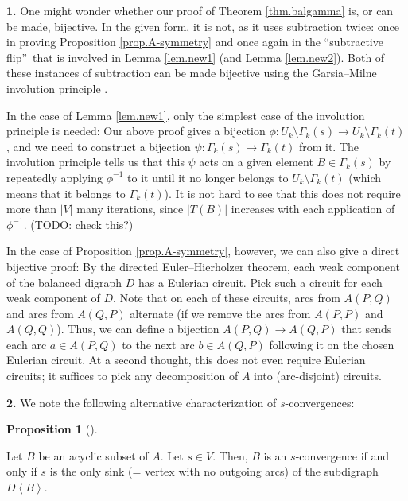 \documentclass[numbers=enddot,12pt,final,onecolumn,notitlepage]{scrartcl}%
\theoremstyle{definition}
\newtheorem{prop}[theo]{Proposition}
\newenvironment{proposition}[1][]
{\begin{prop}[#1]\begin{leftbar}}
{\end{leftbar}\end{prop}}
\theoremstyle{plainsl}
\begin{document}
\hspace{\parindent} \textbf{1.} One might wonder whether our proof of Theorem
\ref{thm.balgamma} is, or can be made, bijective. In the given form, it is
not, as it uses subtraction twice: once in proving Proposition
\ref{prop.A-symmetry} and once again in the \textquotedblleft subtractive
flip\textquotedblright\ that is involved in Lemma \ref{lem.new1} (and Lemma
\ref{lem.new2}). Both of these instances of subtraction can be made bijective
using the Garsia--Milne involution principle \cite[\S 4.6]{StaWhi86}.

In the case of Lemma \ref{lem.new1}, only the simplest case of the involution
principle is needed: Our above proof gives a bijection $\phi:U_{k}%
\setminus\Gamma_{k}\left(  s\right)  \rightarrow U_{k}\setminus\Gamma
_{k}\left(  t\right)  $, and we need to construct a bijection $\psi:\Gamma
_{k}\left(  s\right)  \rightarrow\Gamma_{k}\left(  t\right)  $ from it. The
involution principle tells us that this $\psi$ acts on a given element
$B\in\Gamma_{k}\left(  s\right)  $ by repeatedly applying $\phi^{-1}$ to it
until it no longer belongs to $U_{k}\setminus\Gamma_{k}\left(  t\right)  $
(which means that it belongs to $\Gamma_{k}\left(  t\right)  $). It is not
hard to see that this does not require more than $\left\vert V\right\vert $
many iterations, since $\left\vert T\left(  B\right)  \right\vert $ increases
with each application of $\phi^{-1}$. (TODO: check this?)

In the case of Proposition \ref{prop.A-symmetry}, however, we can also give a
direct bijective proof: By the directed Euler--Hierholzer theorem, each weak
component of the balanced digraph $D$ has a Eulerian circuit. Pick such a
circuit for each weak component of $D$. Note that on each of these circuits,
arcs from $A\left(  P,Q\right)  $ and arcs from $A\left(  Q,P\right)  $
alternate (if we remove the arcs from $A\left(  P,P\right)  $ and $A\left(
Q,Q\right)  $). Thus, we can define a bijection $A\left(  P,Q\right)
\rightarrow A\left(  Q,P\right)  $ that sends each arc $a\in A\left(
P,Q\right)  $ to the next arc $b\in A\left(  Q,P\right)  $ following it on the
chosen Eulerian circuit. At a second thought, this does not even require
Eulerian circuits; it suffices to pick any decomposition of $A$ into
(arc-disjoint) circuits.

\bigskip

\textbf{2.} We note the following alternative characterization of $s$-convergences:

\begin{proposition}
\label{prop.s-conv.2}Let $B$ be an acyclic subset of $A$. Let $s\in V$. Then,
$B$ is an $s$-convergence if and only if $s$ is the only sink (= vertex with
no outgoing arcs) of the subdigraph $D\left\langle B\right\rangle $.
\end{proposition}
\end{document}
